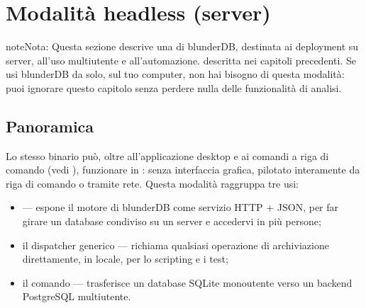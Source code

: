 \documentclass[letterpaper,10pt,italian]{sphinxmanual}
\begin{document}
\sphinxstepscope


\section{Modalità headless (server)}
\label{\detokenize{mode_headless:mode-headless-serveur}}\label{\detokenize{mode_headless:headless}}\label{\detokenize{mode_headless::doc}}
\begin{sphinxadmonition}{note}{Nota:}
\sphinxAtStartPar
Questa sezione descrive una  di blunderDB, destinata ai deployment su server, all’uso multiutente e all’automazione.  descritta nei capitoli precedenti. Se usi blunderDB da solo, sul tuo computer, non hai bisogno di questa modalità: puoi ignorare questo capitolo senza perdere nulla delle funzionalità di analisi.
\end{sphinxadmonition}


\subsection{Panoramica}
\label{\detokenize{mode_headless:vue-d-ensemble}}
\sphinxAtStartPar
Lo stesso binario  può, oltre all’applicazione desktop e ai comandi a riga di comando (vedi {\hyperref[\detokenize{cli:cli}]{}}), funzionare in : senza interfaccia grafica, pilotato interamente da riga di comando o tramite rete. Questa modalità raggruppa tre usi:
\begin{itemize}
\item {} 
\sphinxAtStartPar
{}  — espone il motore di blunderDB come servizio HTTP + JSON, per far girare un database condiviso su un server e accedervi in più persone;

\item {} 
\sphinxAtStartPar
il dispatcher generico  — richiama qualsiasi operazione di archiviazione direttamente, in locale, per lo scripting e i test;

\item {} 
\sphinxAtStartPar
il comando  — trasferisce un database SQLite monoutente verso un backend PostgreSQL multiutente.

\end{itemize}
\end{document}
